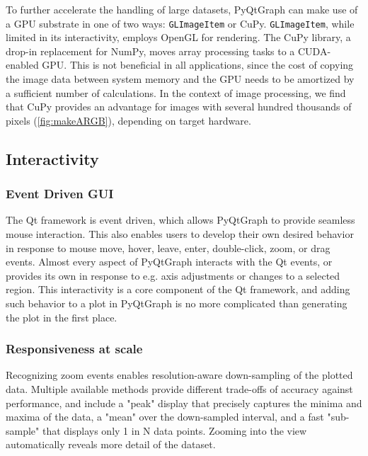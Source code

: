 \label{sec:cuda}
To further accelerate the handling of large datasets, PyQtGraph can make use of a GPU substrate in one of two ways: \texttt{GLImageItem} or CuPy. \texttt{GLImageItem}, while limited in its interactivity, employs OpenGL for rendering. The CuPy library, a drop-in replacement for NumPy, moves array processing tasks to a CUDA-enabled GPU. This is not beneficial in all applications, since the cost of copying the image data between system memory and the GPU needs to be amortized by a sufficient number of calculations. In the context of image processing, we find that CuPy provides an advantage for images with several hundred thousands of pixels (\autoref{fig:makeARGB}), depending on target hardware.

\subsection{Interactivity}
\subsubsection{Event Driven GUI}
The Qt framework is event driven, which allows PyQtGraph to provide seamless mouse interaction. This also enables users to develop their own desired behavior in response to mouse move, hover, leave, enter, double-click, zoom, or drag events. Almost every aspect of PyQtGraph interacts with the Qt events, or provides its own in response to e.g. axis adjustments or changes to a selected region. This interactivity is a core component of the Qt framework, and adding such behavior to a plot in PyQtGraph is no more complicated than generating the plot in the first place.

\subsubsection{Responsiveness at scale}

Recognizing zoom events enables resolution-aware down-sampling of the plotted data. Multiple available methods provide different trade-offs of accuracy against performance, and include a "peak" display that precisely captures the minima and maxima of the data, a "mean" over the down-sampled interval, and a fast "sub-sample" that displays only 1 in N data points. Zooming into the view automatically reveals more detail of the dataset.


